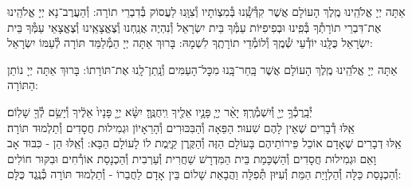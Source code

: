 \documentclass[twoside, openany, parskip=half, 11pt]{book}
\begin{document}
אַתָּה יְיָ אֱלֹהֵֽינוּ מֶֽלֶךְ הָעוֹלָם אֲשֶׁר קִדְּ֯שָֽׁ֯נוּ בְּ֯מִצְוֹתָיו וְ֯צִוָּֽנוּ לַעֲסוֹק בְּ֯דִבְרֵי תוֹרָה: וְ֯הַעֲרֶב־נָא יְיָ אֱלֹהֵֽינוּ אֶת־דִּבְרֵי תוֹרָתְ֯ךָ בְּ֯פִֽינוּ וּבְפִיפִיּוֹת עַמְּ֯ךָ בֵּית יִשְׂרָאֵל וְ֯נִהְיֶה אֲנַֽחְנוּ וְ֯צֶאֱצָאֵֽינוּ וְ֯צֶאֱצָאֵי עַמְּ֯ךָ בֵּית יִשְׂרָאֵל כֻּלָּֽנוּ יוֹדְ֯עֵי שְׁ֯מֶֽךָ וְ֯לוֹמְ֯דֵי תוֹרָתֶֽךָ לִשְׁמָהּ: בָּרוּךְ אַתָּה יְיָ הַמְ֯לַמֵּד תּוֹרָה לְ֯עַמּוֹ יִשְׂרָאֵל:

אַתָּה יְיָ אֱלֹהֵֽינוּ מֶֽלֶךְ הָעוֹלָם אֲשֶׁר בָּֽחַר־בָּֽנוּ מִכׇּל־הָעַמִּים וְ֯נָֽתַן־לָֽנוּ אֶת־תּוֹרָתוֹ: בָּרוּךְ אַתָּה יְיָ נוֹתֵן הַתּוֹרָה:



יְ֯בָֽרֶכְ֯ךָ֥ יְיָ֖ וְ֯יִשְׁמְ֯רֶֽךָ׃ יָאֵ֨ר יְיָ֧ פָּנָ֛יו אֵלֶ֖יךָ וִֽיחֻנֶּֽךָּ׃ יִשָּׂ֨א יְיָ֤ פָּנָיו֙ אֵלֶ֔יךָ וְ֯יָשֵׂ֥ם לְ֯ךָ֖ שָׁלֽוֹם׃\\
אֵֽלּוּ דְ֯בָרִים שֶׁאֵין לָהֶם שִׁעוּר׃ הַפֵּאָה וְ֯הַבִּכּוּרִים וְ֯הָרֵאָיוֹן וּגְמִילוּת חֲסָדִים וְ֯תַלְמוּד תּוֹרָה׃\\
אֵֽלּוּ דְבָרִים שֶׁאָדָם אוֹכֵל פֵּירוֹתֵיהֶם בָּעוֹלָם הַזֶּה וְ֯הַקֶּֽרֶן קַיֶּֽמֶת לוֹ לָעוֹלָם הַבָּא: וְ֯אֵֽלּוּ הֵן - כִּבּוּד אָב וָאֵם וּגְמִילוּת חֲסָדִים וְ֯הַשְׁכָּמַת בֵּית הַמִּדְרָשׁ שַׁחֲרִית וְ֯עַרְבִית וְ֯הַכְנָסַת אוֹרְ֯חִים וּבִקּוּר חוֹלִים וְ֯הַכְנָסַת כַּלָּה וְ֯הַלְוָיַת הַמֵּת וְ֯עִיּוּן תְּ֯פִלָּה וַהֲבָאַת שָׁלוֹם בֵּין אָדָם לַחֲבֵרוֹ - וְ֯תַלְמוּד תּוֹרָה כְּ֯נֶֽגֶד כֻּלָּם:




\newcommand{\adonolam}{

\firstword{אֲדוֹן עוֹלָם}
אֲשֶׁר מָלַךְ \hfill בְּ֯טֶֽרֶם כׇּל־יְ֯צִיר נִבְרָא: \\
לְ֯עֵת נַעֲשָׂה בְ֯חֶפְצוֹ כֹּל \hfill אֲזַי מֶֽלֶךְ שְׁ֯מוֹ נִקְרָא:\\
וְ֯אַֽחֲרֵי כִּכְלוֹת הַכֹּל \hfill לְ֯בַדּוֹ יִמְלֹךְ נוֹרָא: \\
וְ֯הוּא הָיָה וְ֯הוּא הוֶֹה \hfill וְ֯הוּא יִהְיֶה בְּ֯תִפְאָרָה: \\
וְ֯הוּא אֶחָד וְ֯אֵין שֵׁנִי \hfill לְ֯הַמְשִׁיל לוֹ לְ֯הַחְבִּֽירָה: \\
בְּ֯לִי רֵאשִׁית בְּ֯לִי תַכְלִית \hfill וְ֯לוֹ הָעֹז וְ֯הַמִּשְׂרָה: \\
וְ֯הוּא אֵלִי וְ֯חַי גוֹאֲלִי \hfill וְ֯צוּר חֶבְלִי בְּ֯עֵת צָרָה: \\
וְ֯הוּא נִסִּי וּמָנוֹסִי \hfill מְ֯נָת כּוֹסִי בְּ֯יוֹם אֶקְרָא: \\
בְּ֯יָדוֹ אַפְקִיד רוּחִי \hfill בְּ֯עֵת אִישַׁן וְ֯אָעִֽירָה: \\
וְ֯עִם רוּחִי גְּ֯וִיָּתִי \hfill אֲדוֹנָי לִי וְ֯לֹא אִירָא:
}
\end{document}
